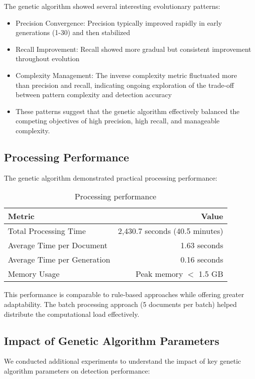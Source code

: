 \documentclass[conference]{IEEEtran}
\begin{document}
The genetic algorithm showed several interesting evolutionary patterns:
\begin{itemize}
    \item Precision Convergence: Precision typically improved rapidly in early generations (1-30) and then stabilized
\item Recall Improvement: Recall showed more gradual but consistent improvement throughout evolution
\item Complexity Management: The inverse complexity metric fluctuated more than precision and recall, indicating ongoing exploration of the trade-off between pattern complexity and detection accuracy
\item
These patterns suggest that the genetic algorithm effectively balanced the competing objectives of high precision, high recall, and manageable complexity.
\end{itemize}

\subsection{\textbf{Processing Performance}}
The genetic algorithm demonstrated practical processing performance:

\begin{table}[htbp]
\caption{Processing performance}
\centering
\renewcommand{\arraystretch}{2.5}
\begin{tabular}{|l|r|}
\hline
\textbf{Metric} & \textbf{Value} \\
\hline
Total Processing Time       & 2,430.7 seconds (40.5 minutes) \\ \hline
Average Time per Document   & 1.63 seconds                   \\ \hline
Average Time per Generation & 0.16 seconds                   \\ \hline
Memory Usage                & Peak memory $<$ 1.5 GB           \\
\hline
\end{tabular}
\label{tab:overall-stats}
\end{table}

This performance is comparable to rule-based approaches while offering greater adaptability. The batch processing approach (5 documents per batch) helped distribute the computational load effectively.

\subsection{\textbf{Impact of Genetic Algorithm Parameters}}
We conducted additional experiments to understand the impact of key genetic algorithm parameters on detection performance:
\end{document}
